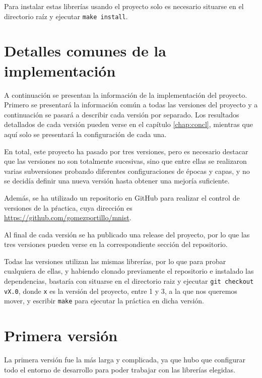\bigskip

Para instalar estas librerías usando el proyecto solo es necesario situarse en el directorio raíz y ejecutar \lstinline{make install}.

\section{Detalles comunes de la implementación}

A continuación se presentan la información de la implementación del proyecto. Primero se presentará la información común a todas las versiones del proyecto y a continuación se pasará a describir cada versión por separado. Los resultados detallados de cada versión pueden verse en el capítulo \ref{chap:concl}, mientras que aquí solo se presentará la configuración de cada una.

\bigskip

En total, este proyecto ha pasado por tres versiones, pero es necesario destacar que las versiones no son totalmente sucesivas, sino que entre ellas se realizaron varias subversiones probando diferentes configuraciones de épocas y capas, y no se decidía definir una nueva versión hasta obtener una mejoría suficiente.

\bigskip

Además, se ha utilizado un repositorio en GitHub para realizar el control de versiones de la pŕactica, cuya dirección es \url{https://github.com/gomezportillo/mnist}.

\bigskip

Al final de cada versión se ha publicado una release del proyecto, por lo que las tres versiones pueden verse en la correspondiente sección del repositorio.

\bigskip

Todas las versiones utilizan las mismas librerías, por lo que para probar cualquiera de ellas, y habiendo clonado previamente el repositorio e instalado las dependencias, bastaría con situarse en el directorio raiz y ejecutar \lstinline{git checkout vX.0}, donde  \lstinline{x} es la versión del proyecto, entre 1 y 3, a la que nos queremos mover, y escribir \lstinline{make} para ejecutar la práctica en dicha versión.

\section{Primera versión}

La primera versión fue la más larga y complicada, ya que hubo que configurar todo el entorno de desarrollo para poder trabajar con las librerías elegidas.

